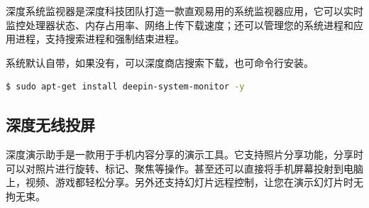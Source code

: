 \documentclass[doctor,openright,twoside]{sjtuthesis}
\theoremstyle{plain}
\theoremstyle{definition}
\theoremstyle{remark}
\theoremstyle{ocrenumbox}
\theoremstyle{plain}
\begin{document}
深度系统监视器是深度科技团队打造一款直观易用的系统监视器应用，它可以实时监控处理器状态、内存占用率、网络上传下载速度；还可以管理您的系统进程和应用进程，支持搜索进程和强制结束进程。


系统默认自带，如果没有，可以深度商店搜索下载，也可命令行安装。

\begin{lstlisting}[language=bash]
$ sudo apt-get install deepin-system-monitor -y
\end{lstlisting}

\hypertarget{section-33}{%
\subsection{深度无线投屏}\label{section-33}}

深度演示助手是一款用于手机内容分享的演示工具。它支持照片分享功能，分享时可以对照片进行旋转、标记、聚焦等操作。甚至还可以直接将手机屏幕投射到电脑上，视频、游戏都轻松分享。另外还支持幻灯片远程控制，让您在演示幻灯片时无拘无束。
\end{document}
